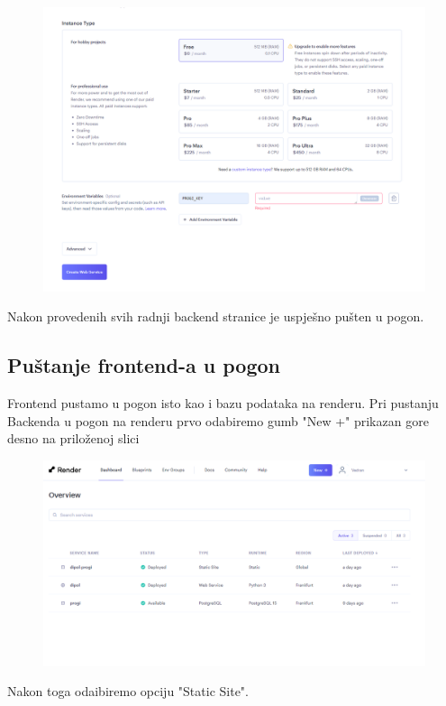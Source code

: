 				\begin{figure}[htb]
					\centering
					\includegraphics[width=15cm]{slike/back_6.png}
					\label{fig:fer-logo}
				\end{figure}
				\text{}Nakon provedenih svih radnji backend stranice je uspješno pušten u pogon.
			\subsection{Puštanje frontend-a u pogon}
			
				\text{} Frontend pustamo u pogon isto kao i bazu podataka na renderu. Pri pustanju Backenda u pogon na renderu prvo odabiremo gumb "New +" prikazan gore desno na priloženoj slici\\
				
				
				\begin{figure}[htb]
					\centering
					\includegraphics[width=15cm]{slike/back_1.png}
					\label{fig:fer-logo}
				\end{figure}
				\newpage
				\text{}Nakon toga odaibiremo opciju "Static Site".\\
				
